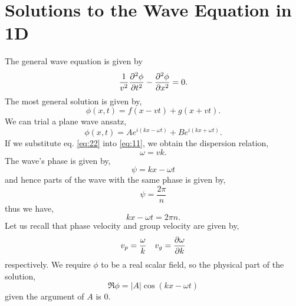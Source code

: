 \documentclass{book}
\begin{document}
\section{Solutions to the Wave Equation in 1D}
The general wave equation is given by
\begin{equation}
	\frac{1}{v^2}\pdv[2]{\phi}{t} - \pdv[2]{\phi}{x} = 0. \label{eq:11}
\end{equation}
The most general solution is given by,
\begin{equation}
	\phi(x,t) = f(x-vt) + g(x + vt).
\end{equation}
We can trial a plane wave ansatz,
\begin{equation}
	\phi(x,t) = Ae^{i(kx-\omega t)} + Be^{i(kx +\omega t)}. \label{eq:22}
\end{equation}
If we substitute eq. \eqref{eq:22} into \eqref{eq:11}, we obtain the dispersion relation,
\begin{equation}
	\omega = vk.
\end{equation}
The wave's phase is given by,
\begin{equation}
	\psi = kx - \omega t
\end{equation}
and hence parts of the wave with the same phase is given by,
\begin{equation}
	\psi = \frac{2\pi}{n}
\end{equation}
thus we have,
\begin{equation}
	kx - \omega t = 2\pi n. 
\end{equation}
Let us recall that phase velocity and group velocity are given by,
\begin{align}
	v_p = \frac{\omega}{k} && v_g = \pdv{\omega}{k}
\end{align}
respectively. We require $\phi$ to be a real scalar field, so the physical part of the solution,
\begin{equation}
	\Re{\phi} = |A|\cos(kx - \omega t)
\end{equation}
given the argument of $A$ is 0. 
\end{document}
